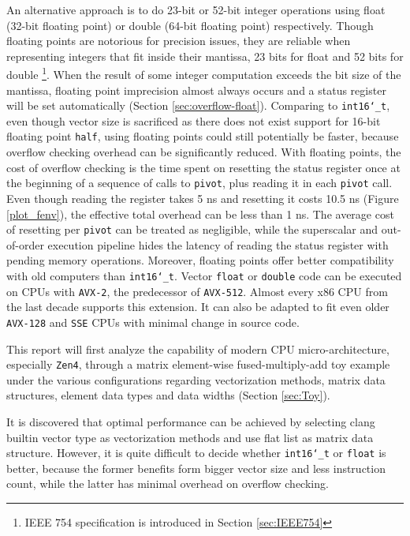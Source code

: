 \documentclass[logo,bsc,singlespacing,parskip]{infthesis}
\newcommand{\dtshort}{\texttt{int16\char`_t}}
\newcommand{\dtfloat}{\texttt{float}}
\newcommand{\dtdouble}{\texttt{double}}
\newcommand{\pivot}{\texttt{pivot}}
\begin{document}
An alternative approach is to do 23-bit or 52-bit integer operations using float
(32-bit floating point) or double (64-bit floating point) respectively. Though
floating points are notorious for precision issues, they are reliable when
representing integers that fit inside their mantissa, 23 bits for float and 52
bits for double \footnote{ IEEE 754 specification is introduced in Section
\ref{sec:IEEE754}}. When the result of some integer computation exceeds the bit
size of the mantissa, floating point imprecision almost always occurs and a
status register will be set automatically (Section \ref{sec:overflow-float}).
Comparing to \dtshort{}, even though vector size is sacrificed as there does not
exist support for 16-bit floating point \texttt{half}, using floating points
could still potentially be faster, because overflow checking overhead can be
significantly reduced. With floating points, the cost of overflow checking is
the time spent on resetting the status register once at the beginning of a
sequence of calls to \pivot{}, plus reading it in each \pivot{} call. Even
though reading the register takes 5 ns and resetting it costs 10.5 ns
(Figure \ref{plot_fenv}), the effective total overhead can be less than 1 ns.
The average cost of resetting per \pivot{} can be treated as negligible, while
the superscalar and out-of-order execution pipeline hides the latency of reading
the status register with pending memory operations. Moreover, floating points
offer better compatibility with old computers than \dtshort{}. Vector \dtfloat{}
or \dtdouble{} code can be executed on CPUs with \texttt{AVX-2}, the predecessor
of \texttt{AVX-512}. Almost every x86 CPU from the last decade supports this
extension. It can also be adapted to fit even older \texttt{AVX-128} and
\texttt{SSE} CPUs with minimal change in source code.

This report will first analyze the capability of modern CPU micro-architecture,
especially \texttt{Zen4}, through a matrix element-wise fused-multiply-add toy
example under the various configurations regarding vectorization methods, matrix
data structures, element data types and data widths (Section \ref{sec:Toy}). 

It is discovered that optimal performance can be achieved by selecting clang
builtin vector type as vectorization methods and use flat list as matrix data
structure. However, it is quite difficult to decide whether \dtshort{} or
\dtfloat{} is better, because the former benefits form bigger vector size
and less instruction count, while the latter has minimal overhead on overflow
checking. 
\end{document}
